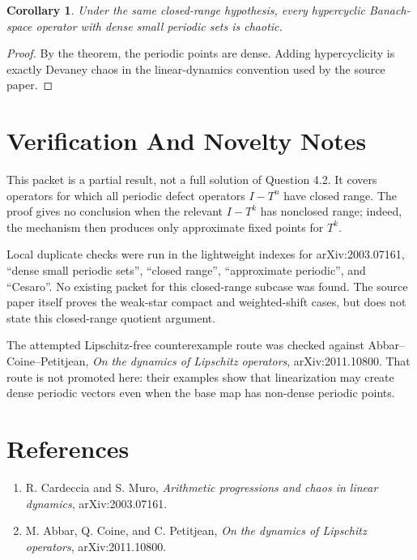 \documentclass[11pt]{article}
\newtheorem{corollary}{Corollary}
\begin{document}
\begin{corollary}
Under the same closed-range hypothesis, every hypercyclic Banach-space
operator with dense small periodic sets is chaotic.
\end{corollary}

\begin{proof}
By the theorem, the periodic points are dense. Adding hypercyclicity is exactly
Devaney chaos in the linear-dynamics convention used by the source paper.
\end{proof}

\section*{Verification And Novelty Notes}

This packet is a partial result, not a full solution of Question 4.2. It covers
operators for which all periodic defect operators $I-T^n$ have closed range.
The proof gives no conclusion when the relevant $I-T^k$ has nonclosed range;
indeed, the mechanism then produces only approximate fixed points for $T^k$.

Local duplicate checks were run in the lightweight indexes for arXiv:2003.07161,
``dense small periodic sets'', ``closed range'', ``approximate periodic'', and
``Cesaro''. No existing packet for this closed-range subcase was found. The
source paper itself proves the weak-star compact and weighted-shift cases, but
does not state this closed-range quotient argument.

The attempted Lipschitz-free counterexample route was checked against
Abbar--Coine--Petitjean, \emph{On the dynamics of Lipschitz operators},
arXiv:2011.10800. That route is not promoted here: their examples show that
linearization may create dense periodic vectors even when the base map has
non-dense periodic points.

\section*{References}

\begin{enumerate}
\item R. Cardeccia and S. Muro, \emph{Arithmetic progressions and chaos in
linear dynamics}, arXiv:2003.07161.
\item M. Abbar, Q. Coine, and C. Petitjean, \emph{On the dynamics of Lipschitz
operators}, arXiv:2011.10800.
\end{enumerate}
\end{document}
